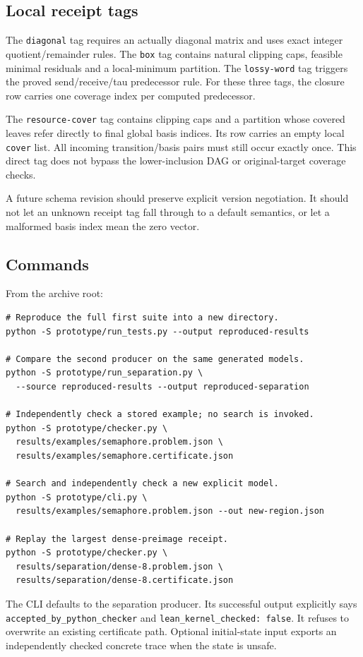 \documentclass[11pt,a4paper]{article}
\theoremstyle{definition}
\newcommand{\code}[1]{\texttt{#1}}
\begin{document}
\subsection{Local receipt tags}
The \code{diagonal} tag requires an actually diagonal matrix and uses exact
integer quotient/remainder rules. The \code{box} tag contains natural clipping
caps, feasible minimal residuals and a local-minimum partition. The
\code{lossy-word} tag triggers the proved send/receive/tau predecessor rule.
For these three tags, the closure row carries one coverage index per computed
predecessor.

The \code{resource-cover} tag contains clipping caps and a partition whose
covered leaves refer directly to final global basis indices. Its row carries
an empty local \code{cover} list. All incoming transition/basis pairs must
still occur exactly once. This direct tag does not bypass the lower-inclusion
DAG or original-target coverage checks.

A future schema revision should preserve explicit version negotiation. It
should not let an unknown receipt tag fall through to a default semantics, or
let a malformed basis index mean the zero vector.

\subsection{Commands}
From the archive root:
\begin{lstlisting}
# Reproduce the full first suite into a new directory.
python -S prototype/run_tests.py --output reproduced-results

# Compare the second producer on the same generated models.
python -S prototype/run_separation.py \
  --source reproduced-results --output reproduced-separation

# Independently check a stored example; no search is invoked.
python -S prototype/checker.py \
  results/examples/semaphore.problem.json \
  results/examples/semaphore.certificate.json

# Search and independently check a new explicit model.
python -S prototype/cli.py \
  results/examples/semaphore.problem.json --out new-region.json

# Replay the largest dense-preimage receipt.
python -S prototype/checker.py \
  results/separation/dense-8.problem.json \
  results/separation/dense-8.certificate.json
\end{lstlisting}
The CLI defaults to the separation producer. Its successful output explicitly
says \code{accepted\_by\_python\_checker} and
\code{lean\_kernel\_checked: false}. It refuses to overwrite an existing
certificate path. Optional initial-state input exports an independently
checked concrete trace when the state is unsafe.
\end{document}
